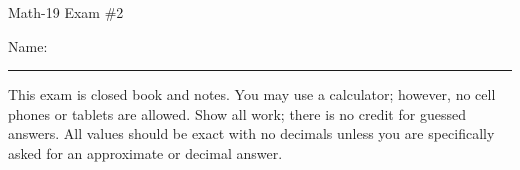 \documentclass[letterpaper,12pt,fleqn]{article}
\begin{document}
\begin{center}
\Large Math-19 Exam \#2
\end{center}

\vspace{0.5in}

Name: \rule{4in}{1pt}

\vspace{0.5in}

This exam is closed book and notes. You may use a calculator; however, no cell
phones or tablets are allowed. Show all work; there is no credit for guessed
answers. All values should be exact with no decimals unless you are
specifically asked for an approximate or decimal answer.

\vspace{0.5in}

\newcommand{\fillin}{\rule[-6pt]{3in}{1pt}}
\newcommand{\sfillin}{\rule[-6pt]{1in}{1pt}}
\end{document}

